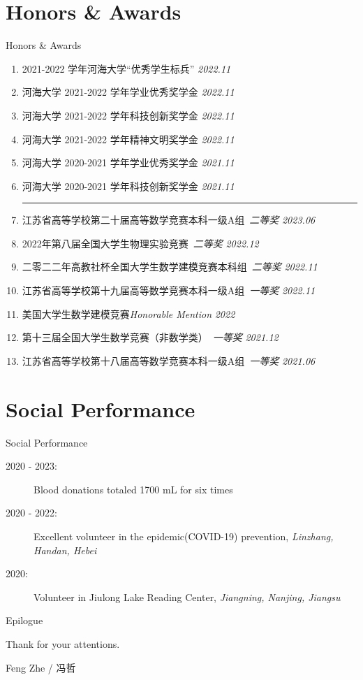 \documentclass[9pt,aspectratio=169,hyperref=colorlinks]{beamer}
\begin{document}
\section{Honors \& Awards}
\begin{frame}{Honors \& Awards}
    \begin{enumerate}
        \item 2021-2022 学年河海大学“优秀学生标兵” \hfill \textit{2022.11}
        \item 河海大学 2021-2022 学年学业优秀奖学金 \hfill \textit{2022.11}
        \item 河海大学 2021-2022 学年科技创新奖学金 \hfill \textit{2022.11}
        \item 河海大学 2021-2022 学年精神文明奖学金 \hfill \textit{2022.11}
        \item 河海大学 2020-2021 学年学业优秀奖学金 \hfill \textit{2021.11}
        \item 河海大学 2020-2021 学年科技创新奖学金 \hfill \textit{2021.11}

              \medskip \hrule \medskip

        \item 江苏省高等学校第二十届高等数学竞赛本科一级A组\ \textit{二等奖} \hfill \textit{2023.06}
        \item 2022年第八届全国大学生物理实验竞赛\ \textit{二等奖}  \hfill \textit{2022.12}
        \item 二零二二年高教社杯全国大学生数学建模竞赛本科组\ \textit{二等奖} \hfill \textit{2022.11}
        \item 江苏省高等学校第十九届高等数学竞赛本科一级A组\ \textit{一等奖} \hfill \textit{2022.11}
        \item 美国大学生数学建模竞赛\textit{Honorable Mention} \hfill \textit{2022}
        \item 第十三届全国大学生数学竞赛（非数学类）\ \textit{一等奖} \hfill \textit{2021.12}
        \item 江苏省高等学校第十八届高等数学竞赛本科一级A组\ \textit{一等奖} \hfill \textit{2021.06}
    \end{enumerate}
\end{frame}

\section{Social Performance}
\begin{frame}{Social Performance}
    \begin{description}
        \item[2020 - 2023:] Blood donations totaled 1700 mL for six times
        \item[2020 - 2022:] Excellent volunteer in the epidemic(COVID-19) prevention, \textit{Linzhang, Handan, Hebei}
        \item[2020:] Volunteer in Jiulong Lake Reading Center, \textit{Jiangning, Nanjing, Jiangsu}
    \end{description}
\end{frame}

\begin{frame}{Epilogue}
    \begin{center}
        {\Huge \calligra Thank for your attentions.}

        \vspace{5em}

        Feng Zhe / 冯哲
    \end{center}
\end{frame}
\end{document}
